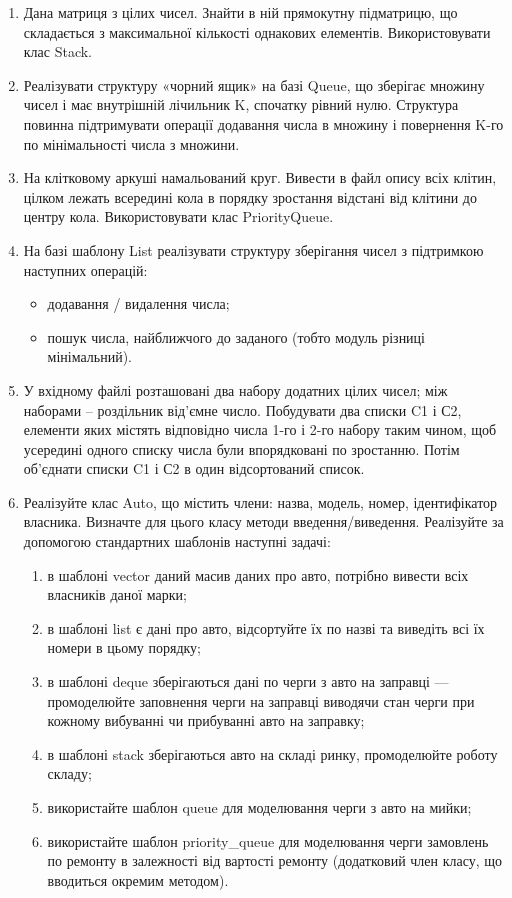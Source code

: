 \documentclass[a5paper,titlepage,openany,twoside,
]
{book_unv}%
\makeatletter
\newcommand{\xslalph}[1]{\expandafter\@xslalph\csname c@#1\endcsname}
\newcommand{\@xslalph}[1]{%
    \ifcase#1\or а\or б\or в\or г\or д\or e\or є\or ж\or з\or i%
    \or й\or к\or л\or м\or н\or о\or п\or р\or с\or т%
    \or у\or ф\or х\or ц\or ч\or ш\or ю\or я\or аа\or бб\or вв%
    \else\@ctrerr\fi%
}
\makeatother
\begin{document}
\begin{enumerate}
\def\labelenumi{\arabic{enumi})}
\setcounter{enumi}{4}

\item
  Дана матриця з цілих чисел. Знайти в ній прямокутну підматрицю, що
  складається з максимальної кількості однакових елементів.
  Використовувати клас Stack.
\item
  Реалізувати структуру «чорний ящик» на базі Queue, що зберігає множину
  чисел і має внутрішній лічильник K, спочатку рівний нулю. Структура
  повинна підтримувати операції додавання числа в множину і повернення
  K-го по мінімальності числа з множини.
\item
  На клітковому аркуші намальований круг. Вивести в файл опису всіх
  клітин, цілком лежать всередині кола в порядку зростання відстані від
  клітини до центру кола. Використовувати клас PriorityQueue.
\item
  На базі шаблону List реалізувати структуру зберігання чисел з
  підтримкою наступних операцій:

  \begin{itemize}
    \item
    додавання / видалення числа;
  \item
    пошук числа, найближчого до заданого (тобто модуль різниці
    мінімальний).
  \end{itemize}
\item
  У вхідному файлі розташовані два набору додатних цілих чисел; між наборами
  -- роздільник від'ємне число. Побудувати два списки C1 і С2, елементи яких
  містять відповідно числа 1-го і 2-го набору таким чином, щоб усередині
  одного списку числа були впорядковані по зростанню. Потім об'єднати
  списки C1 і С2 в один відсортований список.

\item

Реалізуйте клас Auto, що містить члени: назва, модель, номер, ідентифікатор власника.
Визначте для цього класу методи введення/виведення.
Реалізуйте за допомогою стандартних шаблонів наступні задачі:
\begin{enumerate}[label=\xslalph*)]
\item
    в шаблоні vector даний масив даних про авто, потрібно вивести всіх власників даної марки;
\item
    в шаблоні list є дані про авто, відсортуйте їх по назві та виведіть всі їх номери в цьому порядку;
\item
    в шаблоні deque зберігаються дані по черги з авто на заправці --- промоделюйте заповнення черги
на заправці виводячи стан черги при кожному вибуванні чи прибуванні авто на заправку;
\item
    в шаблоні stack зберігаються авто на складі ринку, промоделюйте роботу складу;
\item
    використайте шаблон queue для моделювання черги з авто на мийки;
\item
    використайте шаблон priority\_queue для моделювання черги замовлень по ремонту в
залежності від вартості ремонту (додатковий член класу, що вводиться окремим методом).
\end{enumerate}    


\end{enumerate}
\end{document}
